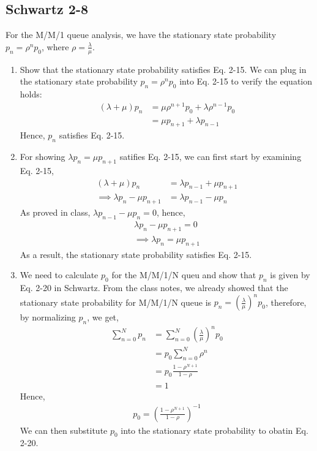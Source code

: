 \documentclass{article}
\begin{document}
		\subsection*{Schwartz 2-8}
			For the M/M/1 queue analysis, we have the stationary state probability $p_{n} = \rho^{n} p_{0}$,
			where $\rho = \frac{\lambda}{\mu}$.
			\begin{enumerate}
				\item Show that the stationary state probability satisfies Eq. 2-15.
					We can plug in the stationary state probability $p_{n} = \rho^{n} p_{0}$
					into Eq. 2-15 to verify the equation holds:
					\begin{align*}
						(\lambda + \mu) p_{n} &= \mu \rho^{n+1} p_{0} + \lambda \rho^{n-1} p_{0} \\
						&= \mu p_{n+1} + \lambda p_{n-1}
					\end{align*}
					Hence, $p_{n}$ satisfies Eq. 2-15.
				\item For showing $\lambda p_{n} = \mu p_{n+1}$ satifies Eq. 2-15, we
					can first start by examining Eq. 2-15,
					\begin{align*}
						(\lambda + \mu) p_{n} &= \lambda p_{n-1} + \mu p_{n+1} \\
						\implies \lambda p_{n} - \mu p_{n+1} &= \lambda p_{n-1} - \mu p_{n}
					\end{align*}
					As proved in class, $\lambda p_{n-1} - \mu p_{n} = 0$, hence,
					\begin{gather*}
						\lambda p_{n} - \mu p_{n+1} = 0 \\
						\implies \lambda p_{n} = \mu p_{n+1} 
					\end{gather*}
					As a result, the stationary state probability satisfies Eq. 2-15.
				\item We need to calculate $p_{0}$ for the M/M/1/N queu and show that $p_{n}$
					is given by Eq. 2-20 in Schwartz.
					From the class notes, we already showed that the stationary state
					probability for M/M/1/N queue is $p_{n} = (\frac{\lambda}{\mu})^n p_{0}$,
					therefore, by normalizing $p_{n}$, we get,
					\begin{align*}
						\sum_{n=0}^{N} p_{n} &= \sum_{n=0}^{N} (\frac{\lambda}{\mu})^n p_{0} \\
						&= p_{0} \sum_{n=0}^{N} \rho^{n} \\
						&= p_{0} \frac{1 - \rho^{N+1}}{1 - \rho} \\
						&= 1
					\end{align*}
					Hence,
					\begin{gather*}
						p_{0} = (\frac{1 - \rho^{N+1}}{1 - \rho})^{-1}
					\end{gather*}
					We can then substitute $p_{0}$ into the stationary state probability
					to obatin Eq. 2-20.
			\end{enumerate}
\end{document}
